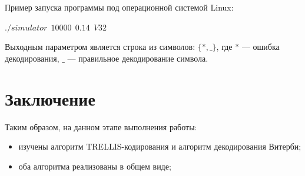 \documentclass[a4paper,12pt]{article}
\begin{document}
Пример запуска программы под операционной системой Linux: 

$./simulator ~~ 10000~~ 0.14 ~~ V32$

Выходным параметром является строка из символов: $\{*, \_\}$, где $*$ --- ошибка декодирования, $\_$ --- правильное
декодирование символа.

\section{Заключение}
Таким образом, на данном этапе выполнения работы:
\begin{itemize}
	\item изучены алгоритм TRELLIS-кодирования и алгоритм декодирования Витерби;
	\item оба алгоритма реализованы в общем виде;
\end{itemize}



\end{document}
